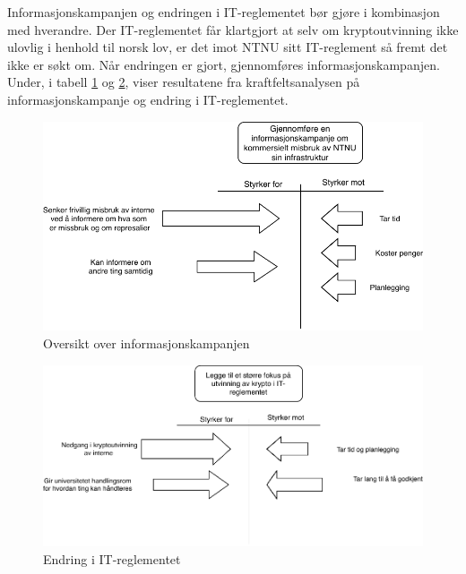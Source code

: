 Informasjonskampanjen og endringen i IT-reglementet bør gjøre i kombinasjon med hverandre. Der IT-reglementet får klartgjort at selv om kryptoutvinning ikke ulovlig i henhold til norsk lov, er det imot NTNU sitt IT-reglement så fremt det ikke er søkt om. Når endringen er gjort, gjennomføres informasjonskampanjen.   
Under, i tabell \ref{fig:kampanje} og \ref{fig:IT-reglement}, viser resultatene fra kraftfeltsanalysen på informasjonskampanje og endring i IT-reglementet.
 \begin{figure}[H]
    \hspace{2.2cm}
    \includegraphics[scale=0.6]{case_3/bilder/Force-field1.pdf}
    \caption[Informasjonskampanje]{Oversikt over informasjonskampanjen }
    \label{fig:kampanje}
\end{figure}

 
 \begin{figure}[H]
    \hspace{2.6cm}
    \includegraphics[scale=0.6]{case_3/bilder/Force-field2.pdf}
    \caption[Endre IT-reglementet]{Endring i IT-reglementet}
    \label{fig:IT-reglement}
\end{figure}

